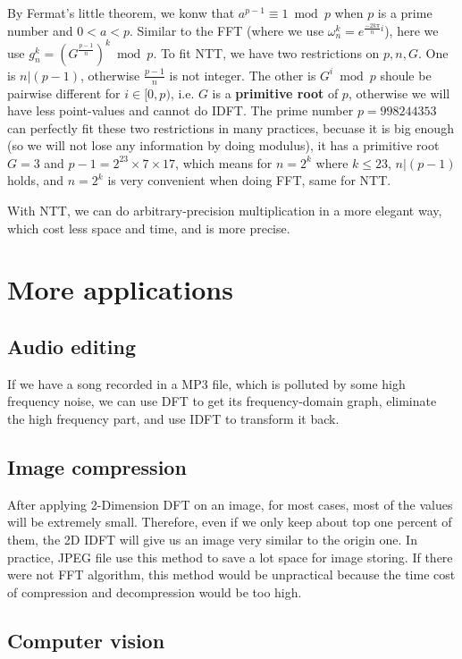\documentclass{article}
\begin{document}
By Fermat's little theorem, we konw that $a^{p-1}\equiv 1\bmod p$ when $p$ is a prime number and $0<a<p$. Similar to the FFT (where we use $\omega_n^k=e^{\frac{-2k\pi}{n}i}$), here we use $g_n^k=(G^{\frac{p-1}{n}})^k\bmod p$. To fit NTT, we have two restrictions on $p,n,G$. One is $n|(p-1)$, otherwise $\frac{p-1}{n}$ is not integer. The other is $G^i\bmod p$ shoule be pairwise different for $i\in[0,p)$, i.e. $G$ is a \textbf{primitive root} of $p$, otherwise we will have less point-values and cannot do IDFT. The prime number $p=998244353$ can perfectly fit these two restrictions in many practices, becuase it is big enough (so we will not lose any information by doing modulus), it has a primitive root $G=3$ and $p-1=2^{23}\times7\times17$, which means for $n=2^k$ where $k\le23$, $n|(p-1)$ holds, and $n=2^k$ is very convenient when doing FFT, same for NTT.

With NTT, we can do arbitrary-precision multiplication in a more elegant way, which cost less space and time, and is more precise.

\section{More applications}

\subsection{Audio editing}

If we have a song recorded in a MP3 file, which is polluted by some high frequency noise, we can use DFT to get its frequency-domain graph, eliminate the high frequency part, and use IDFT to transform it back.

\subsection{Image compression}

After applying 2-Dimension DFT on an image, for most cases, most of the values will be extremely small. Therefore, even if we only keep about top one percent of them, the 2D IDFT will give us an image very similar to the origin one. In practice, JPEG file use this method to save a lot space for image storing. If there were not FFT algorithm, this method would be unpractical because the time cost of compression and decompression would be too high.

\subsection{Computer vision}
\end{document}
